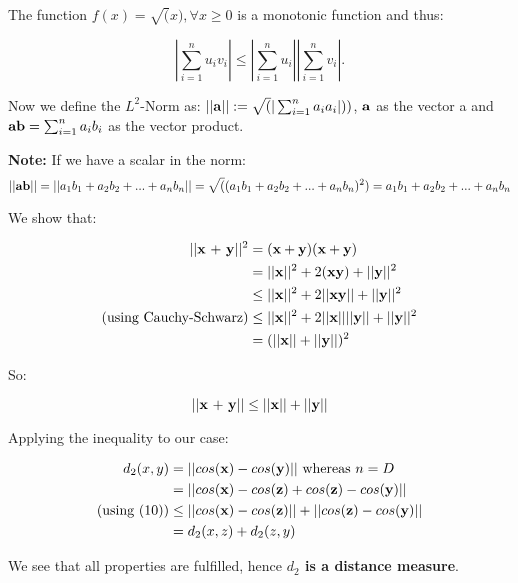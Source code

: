 The function $f(x) = \sqrt(x), \forall x \geq 0$ is a monotonic function and thus:

\[
|\sum_{i=1}^{n}u_iv_i| \leq |\sum_{i=1}^{n}u_i||\sum_{i=1}^{n}v_i|.
\] 

Now we define the $L^2$-Norm as: $||\text{\textbf{a}}|| := \sqrt(|\sum_{i=1}^{n}a_ia_i|))$, $\text{\textbf{a}}$ as the vector a and $\text{\textbf{ab}} = \sum_{i=1}^{n}a_ib_i$
as the vector product. 

\textbf{Note:} If we have a scalar in the norm: 
\[
||\text{\textbf{ab}}|| = ||a_1b_1 + a_2b_2 + ... + a_nb_n|| = \sqrt((a_1b_1 + a_2b_2 + ... + a_nb_n)^2) = a_1b_1 + a_2b_2 + ... + a_nb_n
\]

We show that:

\begin{align}
||\text{\textbf{x} + \textbf{y}}||^2 &= (\textbf{x} + \textbf{y})(\textbf{x} + \textbf{y}) \\
			&= ||\text{\textbf{x}}||^2 + 2(\textbf{x}\textbf{y}) + ||\text{\textbf{y}}||^2 \\
			& \leq ||\text{\textbf{x}}||^2 + 2||\text{\textbf{xy}}|| + ||\text{\textbf{y}}||^2 \\
\text{(using Cauchy-Schwarz)} &\leq ||\text{\textbf{x}}||^2 + 2||\textbf{x}||||\textbf{y}|| + ||\text{\textbf{y}}||^2\\
			&= (||\text{\textbf{x}}|| + ||\text{\textbf{y}}||)^2
\end{align}

So:

\begin{equation}
||\text{\textbf{x} + \textbf{y}}|| \leq ||\text{\textbf{x}}|| + ||\text{\textbf{y}}||
\end{equation}

Applying the inequality to our case:

\begin{align}
d_2(x,y) &= ||cos(\text{\textbf{x}}) - cos(\text{\textbf{y}})|| \text{ whereas } n = D \\
	   &= ||cos(\text{\textbf{x}}) - cos(\text{\textbf{z}}) + cos(\text{\textbf{z}}) - cos(\text{\textbf{y}})|| \\
(\text{using (10)})	   & \leq ||cos(\text{\textbf{x}}) - cos(\text{\textbf{z}})|| + ||cos(\text{\textbf{z}}) - cos(\text{\textbf{y}})|| \\
	   &= d_2(x,z) + d_2(z,y)
\end{align}
 
We see that all properties are fulfilled, hence \textbf{$d_2$ is 
a distance measure}.


